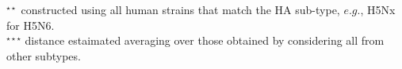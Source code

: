 \begin{table}[!ht]\centering
{}\label{irattab}

\sffamily\fontsize{7}{8}\selectfont


\flushleft

 \fontsize{8}{8}\selectfont
 $^{\star\star}$  \enet constructed using all human strains that match the HA sub-type, $e.g.$, H5Nx for H5N6.\\
 $^{\star\star\star}$ distance estaimated averaging over those obtained by considering all  from other subtypes.%
\end{table}
\else
{}\label{irattab}
\fi




\ifFIGS

\begin{table}[!ht]\centering
{}\label{riskytab}

\sffamily\fontsize{7}{8}\selectfont


\end{table}
\else
{}\label{riskytab}
\fi
\ifFIGS

